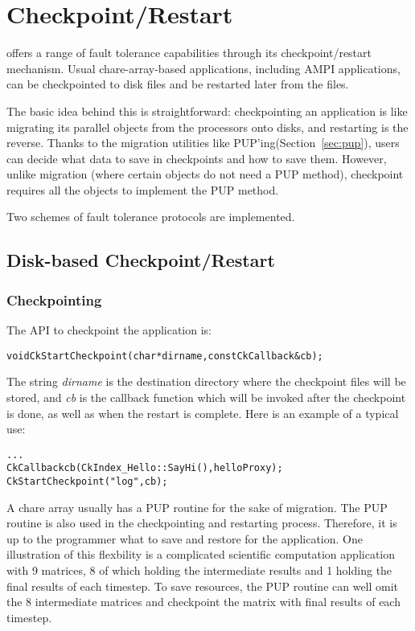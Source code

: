 \section{Checkpoint/Restart}

\label{sec:checkpoint}

\charmpp{} offers a range of fault tolerance capabilities through its 
checkpoint/restart mechanism. Usual chare-array-based \charmpp{} applications, 
including AMPI applications, can be checkpointed to disk files and be restarted later from the files.

The basic idea behind this is straightforward: checkpointing an 
application is like migrating its parallel objects from the processors
onto disks, and restarting is the reverse. Thanks to the migration 
utilities like PUP'ing(Section~\ref{sec:pup}), users can decide what 
data to save in checkpoints and how to save them. However, unlike migration (where certain objects do not need a PUP method), checkpoint requires all the objects to implement the PUP method.

Two schemes of fault tolerance protocols are implemented.

\subsection{Disk-based Checkpoint/Restart}

\subsubsection{Checkpointing}

\label{sec:diskcheckpoint}
	The API to checkpoint the application is:

\begin{alltt} 
  void CkStartCheckpoint(char* dirname,const CkCallback& cb);
\end{alltt}

The string {\it dirname} is the destination directory where the checkpoint
files will be stored, and {\it cb} is the callback function which will be
invoked after the checkpoint is done, as well as when the restart is
complete. Here is an example of a typical use:

\begin{alltt} 
  . . .
  CkCallback cb(CkIndex_Hello::SayHi(),helloProxy);
  CkStartCheckpoint("log",cb);
\end{alltt}

A chare array usually has a PUP routine for the sake of migration. 
The PUP routine is also used in the checkpointing and restarting process.
Therefore, it is up to the programmer what to save and restore for
the application. One illustration of this flexbility is a complicated
scientific computation application with 9 matrices, 8 of which holding 
the intermediate results and 1 holding the final results of each timestep.
To save resources, the PUP routine can well omit the 8 intermediate matrices
and checkpoint the matrix with final results of each timestep. 

